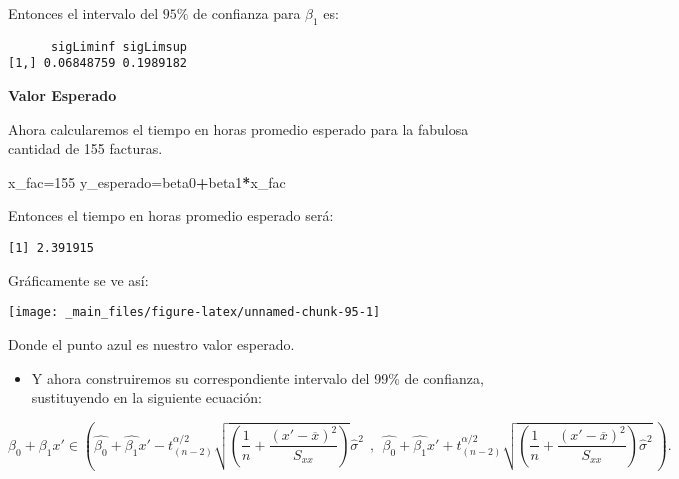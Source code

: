 \documentclass[
  a4paper,
  oneside,
  openany]{book}
\newenvironment{Shaded}{\begin{snugshade}}{\end{snugshade}}
\newcommand{\DecValTok}[1]{\textcolor[rgb]{0.00,0.00,0.81}{#1}}
\newcommand{\NormalTok}[1]{#1}
\newcommand{\OperatorTok}[1]{\textcolor[rgb]{0.81,0.36,0.00}{\textbf{#1}}}
\providecommand{\tightlist}{%
  \setlength{\itemsep}{0pt}\setlength{\parskip}{0pt}}
\begin{document}
Entonces el intervalo del \(95\%\) de confianza para \(\beta_{1}\) es:

\begin{verbatim}
      sigLiminf sigLimsup
[1,] 0.06848759 0.1989182
\end{verbatim}

\textbf{Valor Esperado}

Ahora calcularemos el tiempo en horas promedio esperado para la fabulosa cantidad de 155 facturas.

\begin{Shaded}
\begin{Highlighting}[]
\NormalTok{x\_fac=}\DecValTok{155}
\NormalTok{y\_esperado=beta0}\OperatorTok{+}\NormalTok{beta1}\OperatorTok{*}\NormalTok{x\_fac}
\end{Highlighting}
\end{Shaded}

Entonces el tiempo en horas promedio esperado será:

\begin{verbatim}
[1] 2.391915
\end{verbatim}

Gráficamente se ve así:

\begin{center}\texttt{[image: \_main\_files/figure-latex/unnamed-chunk-95-1]} \end{center}

Donde el punto azul es nuestro valor esperado.

\begin{itemize}
\tightlist
\item
  Y ahora construiremos su correspondiente intervalo del 99\% de confianza, sustituyendo en la siguiente ecuación:
\end{itemize}

\[\beta_{0}+\beta_{1}x' \in \left(\hat{\beta_{0}}+\hat{\beta_{1}}x'-t_{(n-2)}^{\alpha/2}\sqrt{\left( \frac{1}{n}+\frac{(x'-\overline{x})^2}{S_{xx}}\right)}\hat{\sigma}^2 \ \ , \ \ \hat{\beta_{0}}+\hat{\beta_{1}}x'+t_{(n-2)}^{\alpha/2}\sqrt{\left( \frac{1}{n}+\frac{(x'-\overline{x})^2}{S_{xx}}\right)\hat{\sigma}^2} \ \right).\]
\end{document}
